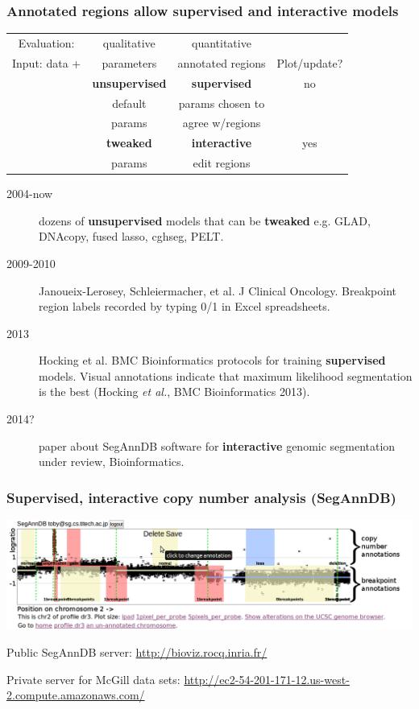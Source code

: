 \documentclass{beamer}
\begin{document}
\begin{frame}
  \frametitle{Annotated regions allow supervised and interactive models}
  \begin{tabular}{c|c|c|c}
    Evaluation: & qualitative & quantitative \\
    Input: data + & parameters & annotated regions & Plot/update?\\
    \hline
    & \textbf{unsupervised} & \textbf{supervised} & no\\
    & default & params chosen to \\
    & params & agree w/regions\\
    \hline
    & \textbf{tweaked} & \textbf{interactive} & yes\\
    & params & edit regions
  \end{tabular}
  \begin{description}
  \item[2004-now] dozens of \textbf{unsupervised} models that can be
    \textbf{tweaked} e.g. GLAD, DNAcopy, fused lasso, cghseg, PELT.
  \item[2009-2010] Janoueix-Lerosey, Schleiermacher, et al. J Clinical
    Oncology. Breakpoint region labels recorded by typing 0/1 in Excel
    spreadsheets.
  \item[2013] Hocking et al. BMC Bioinformatics protocols for training
    \textbf{supervised} models.
  \alert<2>{Visual annotations indicate that maximum likelihood
    segmentation is the best (Hocking \textit{et al.}, BMC
    Bioinformatics 2013).}
  \item[2014?] paper about SegAnnDB software for \textbf{interactive}
    genomic segmentation under review, Bioinformatics.
  \end{description}
\end{frame}

\begin{frame}
  \frametitle{Supervised, interactive copy number analysis (SegAnnDB)}

\includegraphics[width=\textwidth]{new-new-annotations}

\vskip 0.2in
Public SegAnnDB server: \url{http://bioviz.rocq.inria.fr/}

\vskip 0.1in
Private server for McGill data sets:
\small
\url{http://ec2-54-201-171-12.us-west-2.compute.amazonaws.com/}

\end{frame}
\end{document}
